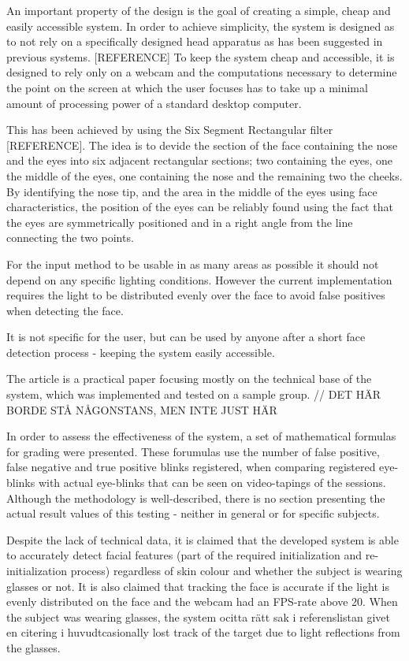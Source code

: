 \documentclass[a4paper,10pt]{article}
\begin{document}
An important property of the design is the goal of creating a simple, cheap and easily accessible system. In order to achieve simplicity, the system is designed as to not rely on a specifically designed head apparatus as has been suggested in previous systems. [REFERENCE] To keep the system cheap and accessible, it is designed to rely only on a webcam and the computations necessary to determine the point on the screen at which the user focuses has to take up a minimal amount of processing power of a standard desktop computer. 

This has been achieved by using the Six Segment Rectangular filter [REFERENCE]. The idea is to devide the section of the face containing the nose and the eyes into six adjacent rectangular sections; two containing the eyes, one the middle of the eyes, one containing the nose and the remaining two the cheeks. By identifying the nose tip, and the area in the middle of the eyes using face characteristics, the position of the eyes can be reliably found using the fact that the eyes are symmetrically positioned and in a right angle from the line connecting the two points.

For the input method to be usable in as many areas as possible it should not depend on any specific lighting conditions. However the current implementation requires the light to be distributed evenly over the face to avoid false positives when detecting the face.

It is not specific for the user, but can be used by anyone after a short face detection process - keeping the system easily accessible.

The article is a practical paper focusing mostly on the technical base of the system, which was implemented and tested on a sample group. // DET HÄR BORDE STÅ NÅGONSTANS, MEN INTE JUST HÄR

In order to assess the effectiveness of the system, a set of mathematical formulas for grading were presented. These forumulas use the number of false positive, false negative and true positive blinks registered, when comparing registered eye-blinks with actual eye-blinks that can be seen on video-tapings of the sessions. Although the methodology is well-described, there is no section presenting the actual result values of this testing - neither in general or for specific subjects.

Despite the lack of technical data, it is claimed that the developed system is able to accurately detect facial features (part of the required initialization and re-initialization process) regardless of skin colour and whether the subject is wearing glasses or not. It is also claimed that tracking the face is accurate if the light is evenly distributed on the face and the webcam had an FPS-rate above 20. When the subject was wearing glasses, the system ocitta rätt sak i referenslistan givet en citering i huvudtcasionally lost track of the target due to light reflections from the glasses.
\end{document}
